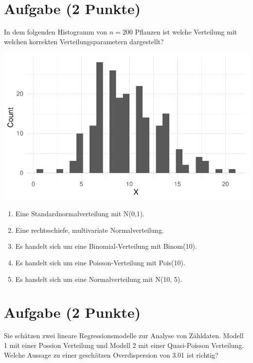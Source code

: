 \documentclass[a4paper, 10pt]{scrartcl}\usepackage[]{graphicx}\usepackage[]{xcolor}
\makeatletter
\def\maxwidth{ %
  \ifdim\Gin@nat@width>\linewidth
    \linewidth
  \else
    \Gin@nat@width
  \fi
}
\makeatother
\begin{document}
\section{Aufgabe \hfill (2 Punkte)}

In dem folgenden Histogramm von $n = 200$ Pflanzen ist welche Verteilung
mit welchen korrekten Verteilungsparametern dargestellt?



{\centering \includegraphics[width=\maxwidth]{img/mc-distribution-02-a-1} 

}







\begin{enumerate}
\item [\textbf{A} \msquare] Eine Standardnormalverteilung mit N(0,1).
\item [\textbf{B} \msquare] Eine rechtsschiefe, multivariate Normalverteilung.
\item [\textbf{C} \msquare] Es handelt sich um eine Binomial-Verteilung mit Binom(10).
\item [\textbf{D} \msquare] Es handelt sich um eine Poisson-Verteilung mit Pois(10).
\item [\textbf{E} \msquare] Es handelt sich um eine Normalverteilung mit N(10, 5).
\end{enumerate} 

\section{Aufgabe \hfill (2 Punkte)}



Sie sch{\"a}tzen zwei lineare Regressionsmodelle zur Analyse von
Z{\"a}hldaten. Modell 1 mit einer Possion Verteilung und Modell 2 mit einer
Quasi-Poisson Verteilung. Welche Aussage zu einer gesch{\"a}tzen Overdispersion
von 3.01 ist richtig?
\end{document}
